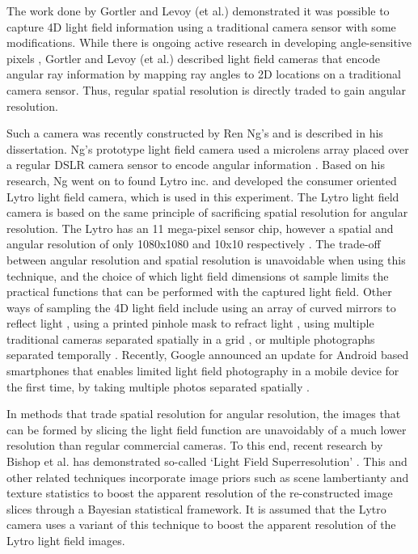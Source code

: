 The work done by Gortler and Levoy (et al.) demonstrated it was possible to capture 4D light field information using a traditional camera sensor with some modifications.
While there is ongoing active research in developing angle-sensitive pixels \cite{wang2009angle, wang2011angle, wang2012angle}, Gortler and Levoy (et al.) described light field cameras that encode angular ray information by mapping ray angles to 2D locations on a traditional camera sensor.
Thus, regular spatial resolution is directly traded to gain angular resolution.

Such a camera was recently constructed by Ren Ng's and is described in his dissertation.
Ng's prototype light field camera used a microlens array placed over a regular DSLR camera sensor to encode angular information \cite{ng2006digital}.
Based on his research, Ng went on to found Lytro inc. and developed the consumer oriented Lytro light field camera, which is used in this experiment.
The Lytro light field camera is based on the same principle of sacrificing spatial resolution for angular resolution.
The Lytro has an 11 mega-pixel sensor chip, however a spatial and angular resolution of only 1080x1080 and 10x10 respectively \cite{lytro2014techspecs}.
The trade-off between angular resolution and spatial resolution is unavoidable when using this technique, and the choice of which light field dimensions ot sample limits the practical functions that can be performed with the captured light field.
Other ways of sampling the 4D light field include using an array of curved mirrors to reflect light \cite{nayar2004programmable}, using a printed pinhole mask to refract light \cite{veeraraghavan2007dappled}, using multiple traditional cameras separated spatially in a grid \cite{wilburn2005high}, or multiple photographs separated temporally \cite{levoy1996light}.
Recently, Google announced an update for Android based smartphones that enables limited light field photography in a mobile device for the first time, by taking multiple photos separated spatially \cite{google2014lensblur}.

In methods that trade spatial resolution for angular resolution, the images that can be formed by slicing the light field function are unavoidably of a much lower resolution than regular commercial cameras.
To this end, recent research by Bishop et al. has demonstrated so-called \enquote*{Light Field Superresolution} \cite{bishop2009light}.
This and other related techniques incorporate image priors such as scene lambertianty and texture statistics to boost the apparent resolution of the re-constructed image slices through a Bayesian statistical framework.
It is assumed that the Lytro camera uses a variant of this technique to boost the apparent resolution of the Lytro light field images.

